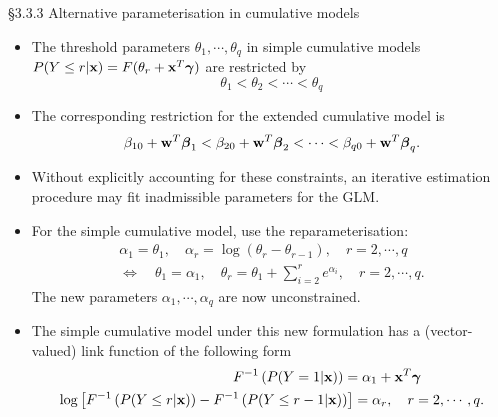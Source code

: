\documentclass{beamer}
\newenvironment{wideitemize}%
  {\begin{itemize}%
    \setlength{\parskip}{1em}}%
  {\end{itemize}}
\begin{document}
\begin{frame}{\S3.3.3 Alternative parameterisation in cumulative models }
\begin{wideitemize}
\item
The threshold parameters $\theta_1,\cdots,\theta_q$ in simple cumulative models 
$P(Y\leq r|\textbf{x})=F(\theta_r+\textbf{x}^T\mbox{\boldmath $\gamma$})$ are restricted by
$$\theta_1<\theta_2<\cdots<\theta_q$$
\item
The corresponding restriction for the extended cumulative model is
$$\beta_{10}+\textbf{w}^T\mbox{\boldmath $\beta$}_1<\beta_{20}+\textbf{w}^T\mbox{\boldmath $\beta$}_2
<\cdots < \beta_{q0}+\textbf{w}^T\mbox{\boldmath $\beta$}_q.$$

\item Without explicitly accounting for these constraints, an  iterative estimation procedure
may fit inadmissible parameters for the GLM.
\end{wideitemize}
\end{frame}

\begin{frame}\begin{wideitemize}
\item
For the simple cumulative model, use the  reparameterisation:
\begin{eqnarray*}
\alpha_1=\theta_1,\quad \alpha_r=\log (\theta_r-\theta_{r-1}), \quad r=2,\cdots, q \\
\Longleftrightarrow\quad \theta_1=\alpha_1,\quad \theta_r=\theta_1+\sum_{i=2}^r e^{\alpha_i}, \quad
r=2,\cdots,q.
\end{eqnarray*}
The new parameters $\alpha_1,\cdots,\alpha_q$ are now unconstrained.
\item
The simple cumulative model under this new formulation has a (vector-valued) link function  of the following form
\begin{eqnarray*}
F^{-1}\left(P(Y=1|\textbf{x})\right)=\alpha_1+\textbf{x}^T\mbox{\boldmath $\gamma$\hspace{45pt}} \\
\log\left[F^{-1}\left(P(Y\leq r|\textbf{x})\right)-F^{-1}\left(P(Y\leq r-1|\textbf{x})\right)\right]=\alpha_r,
\quad r=2,\cdots,q.
\end{eqnarray*}

\end{wideitemize}
\end{frame}
\end{document}
